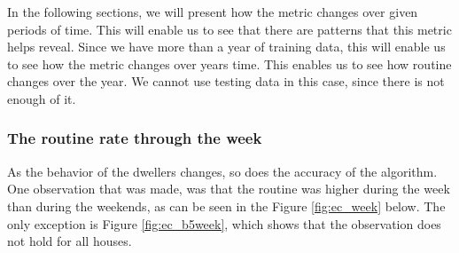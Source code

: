 In the following sections, we will present how the metric changes over given periods of time.
This will enable us to see that there are patterns that this metric helps reveal. 
Since we have more than a year of training data, this will enable us to see how the metric changes over years time.
This enables us to see how routine changes over the year. 
We cannot use testing data in this case, since there is not enough of it.

\subsubsection{The routine rate through the week} \label{sssec:ratio_week}

As the behavior of the dwellers changes, so does the accuracy of the algorithm. 
One observation that was made, was that the routine was higher during the week than during the weekends,
as can be seen in the Figure \ref{fig:ec_week} below. 
The only exception is Figure \ref{fig:ec_b5week}, which shows that the observation does not hold for all houses. 

